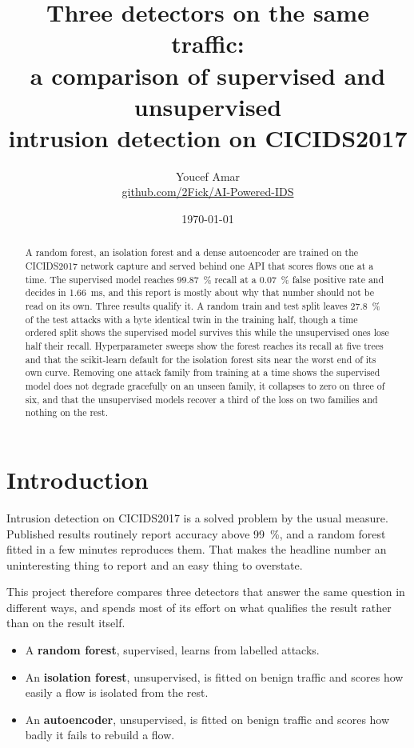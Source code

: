 \documentclass[9pt,a4paper,twocolumn]{article}
\title{\vspace{-8mm}\bfseries Three detectors on the same traffic:\\
a comparison of supervised and unsupervised\\
intrusion detection on CICIDS2017}
\author{Youcef Amar\\
\small \href{https://github.com/2Fick/AI-Powered-IDS}{github.com/2Fick/AI-Powered-IDS}}
\date{\small\today}
\begin{document}
\maketitle

\begin{abstract}
\noindent\small
A random forest, an isolation forest and a dense autoencoder are trained on the
CICIDS2017 network capture and served behind one API that scores flows one at a
time. The supervised model reaches \SI{99.87}{\percent} recall at a
\SI{0.07}{\percent} false positive rate and decides in \SI{1.66}{\milli\second},
and this report is mostly about why that number should not be read on its own.
Three results qualify it. A random train and test split leaves
\SI{27.8}{\percent} of the test attacks with a byte identical twin in the
training half, though a time ordered split shows the supervised model survives
this while the unsupervised ones lose half their recall. Hyperparameter sweeps
show the forest reaches its recall at five trees and that the scikit-learn
default for the isolation forest sits near the worst end of its own curve.
Removing one attack family from training at a time shows the supervised model
does not degrade gracefully on an unseen family, it collapses to zero on three
of six, and that the unsupervised models recover a third of the loss on two
families and nothing on the rest.
\end{abstract}

\section{Introduction}

Intrusion detection on CICIDS2017 is a solved problem by the usual measure.
Published results routinely report accuracy above \SI{99}{\percent}, and a
random forest fitted in a few minutes reproduces them. That makes the headline
number an uninteresting thing to report and an easy thing to overstate.

This project therefore compares three detectors that answer the same question
in different ways, and spends most of its effort on what qualifies the result
rather than on the result itself.

\begin{itemize}\itemsep1pt
  \item A \textbf{random forest}, supervised, learns from labelled attacks.
  \item An \textbf{isolation forest}, unsupervised, is fitted on benign traffic
        and scores how easily a flow is isolated from the rest.
  \item An \textbf{autoencoder}, unsupervised, is fitted on benign traffic and
        scores how badly it fails to rebuild a flow.
\end{itemize}
\end{document}
